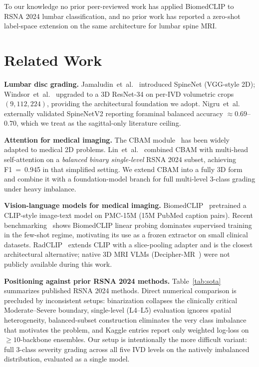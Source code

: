 \documentclass[runningheads]{llncs}
\begin{document}
To our knowledge no prior peer-reviewed work has applied BiomedCLIP to
RSNA 2024 lumbar classification, and no prior work has reported a
zero-shot label-space extension on the same architecture for lumbar
spine MRI.

\section{Related Work}
\label{sec:related}

\textbf{Lumbar disc grading.}
Jamaludin~et~al.~\cite{jamaludin2017} introduced SpineNet (VGG-style
2D); Windsor~et~al.~\cite{windsor2022} upgraded to a 3D ResNet-34
on per-IVD volumetric crops $(9,112,224)$, providing the
architectural foundation we adopt. Nigru~et~al.~\cite{nigru2024}
externally validated SpineNetV2 reporting foraminal balanced
accuracy $\approx 0.69$--$0.70$, which we treat as the sagittal-only
literature ceiling.

\textbf{Attention for medical imaging.}
The CBAM module~\cite{woo2018cbam} has been widely adapted to medical
2D problems. Lin~et~al.~\cite{lin2024cbam} combined CBAM with
multi-head self-attention on a \emph{balanced binary single-level}
RSNA 2024 subset, achieving F1~=~0.945 in that simplified setting.
We extend CBAM into a fully 3D form and combine it with a
foundation-model branch for full multi-level 3-class grading under
heavy imbalance.

\textbf{Vision-language models for medical imaging.}
BiomedCLIP~\cite{zhang2023biomedclip} pretrained a CLIP-style
image-text model on PMC-15M (15M PubMed caption pairs). Recent
benchmarking~\cite{datascarcity2024} shows BiomedCLIP linear
probing dominates supervised training in the few-shot regime,
motivating its use as a frozen extractor on small clinical
datasets. RadCLIP~\cite{lu2024radclip} extends CLIP with a
slice-pooling adapter and is the closest architectural alternative;
native 3D MRI VLMs (Decipher-MR~\cite{yang2026deciphermr}) were not
publicly available during this work.

\textbf{Positioning against prior RSNA 2024 methods.}
Table~\ref{tab:sota} summarizes published RSNA 2024 methods. Direct
numerical comparison is precluded by inconsistent setups:
binarization collapses the clinically critical Moderate--Severe
boundary, single-level (L4--L5) evaluation ignores spatial
heterogeneity, balanced-subset construction eliminates the very
class imbalance that motivates the problem, and Kaggle entries
report only weighted log-loss on $\geq 10$-backbone ensembles. Our
setup is intentionally the more difficult variant: full 3-class
severity grading across all five IVD levels on the natively
imbalanced distribution, evaluated as a single model.
\end{document}
